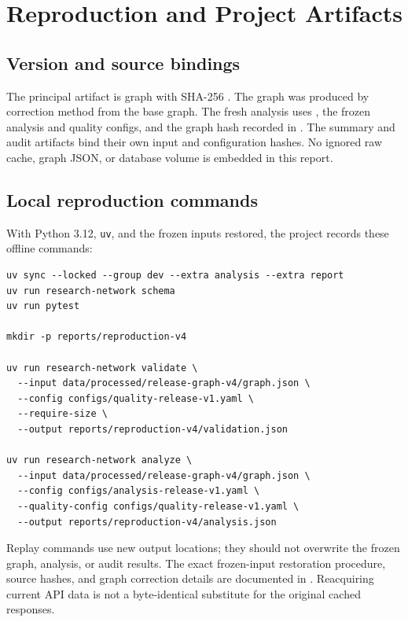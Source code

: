 \chapter{Reproduction and Project Artifacts}
\label{chap:reproduction}

\section{Version and source bindings}

The principal artifact is graph \GraphVersion{} with SHA-256
.
The graph was produced by correction method
 from the
 base graph. The fresh analysis uses
, the frozen analysis and quality configs,
and the graph hash recorded in .
The summary and audit artifacts bind their own input and configuration hashes.
No ignored raw cache, graph JSON, or database volume is embedded in this report.

\section{Local reproduction commands}

With Python 3.12, \texttt{uv}, and the frozen inputs restored, the project records
these offline commands:

\begin{verbatim}
uv sync --locked --group dev --extra analysis --extra report
uv run research-network schema
uv run pytest

mkdir -p reports/reproduction-v4

uv run research-network validate \
  --input data/processed/release-graph-v4/graph.json \
  --config configs/quality-release-v1.yaml \
  --require-size \
  --output reports/reproduction-v4/validation.json

uv run research-network analyze \
  --input data/processed/release-graph-v4/graph.json \
  --config configs/analysis-release-v1.yaml \
  --quality-config configs/quality-release-v1.yaml \
  --output reports/reproduction-v4/analysis.json
\end{verbatim}

Replay commands use new output locations; they should not overwrite the frozen
graph, analysis, or audit results. The exact frozen-input restoration procedure,
source hashes, and graph correction details are documented in
\sourcepath{docs/reproduce-remediation-v4.md}. Reacquiring current API data is
not a byte-identical substitute for the original cached responses.

